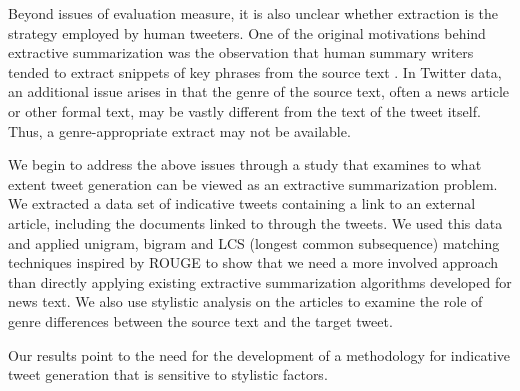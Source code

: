 Beyond issues of evaluation measure, it is also unclear whether extraction is the strategy employed by human tweeters. One of the original motivations behind extractive summarization was the observation that human summary writers tended to extract snippets of key phrases from the source text \cite{mani-2001}. In Twitter data, an additional issue arises in that the genre of the source text, often a news article or other formal text, may be vastly different from the text of the tweet itself. Thus, a genre-appropriate extract may not be available.



We begin to address the above issues through a study that examines to what extent tweet generation can be viewed as an extractive summarization problem. We extracted a data set of indicative tweets containing a link to an external article, including the documents linked to through the tweets. We used this data and applied unigram, bigram and LCS (longest common subsequence) matching techniques inspired by ROUGE to show that we need a more involved approach than directly applying existing extractive summarization algorithms developed for news text. We also use stylistic analysis on the articles to examine the role of genre differences between the source text and the target tweet.

Our results point to the need for the development of a methodology for indicative tweet generation that is sensitive to stylistic factors. 